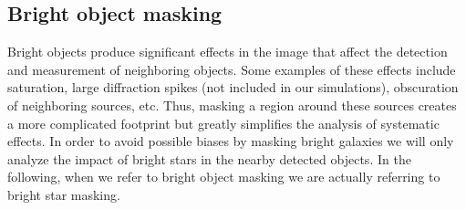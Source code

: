 \documentclass[twocolumn]{aastex62}
\begin{document}
\subsection{Bright object masking}

Bright objects produce significant effects in the image that affect the detection and measurement of neighboring objects. Some examples of these effects include saturation, large diffraction spikes (not included in our simulations), obscuration of neighboring sources, etc. Thus, masking a region around these sources creates a more complicated footprint but greatly simplifies the analysis of systematic effects. In order to avoid possible biases by masking bright galaxies we will only analyze the impact of bright stars in the nearby detected objects. In the following, when we refer to bright object masking we are actually referring to bright star masking.
\end{document}
